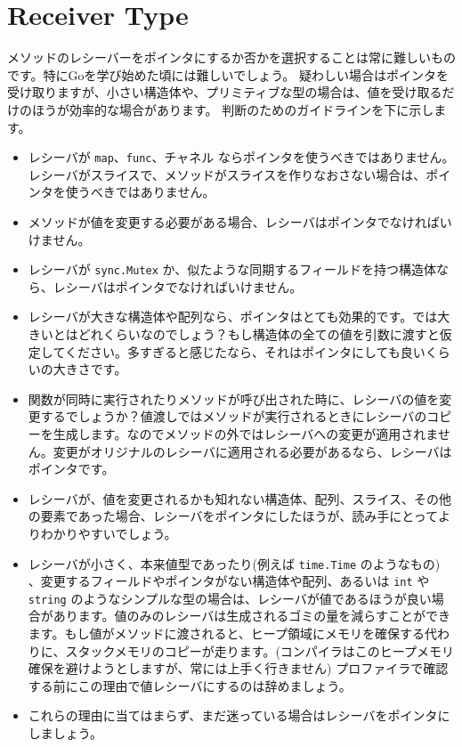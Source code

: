 \section{Receiver Type}

メソッドのレシーバーをポインタにするか否かを選択することは常に難しいものです。特にGoを学び始めた頃には難しいでしょう。 疑わしい場合はポインタを受け取りますが、小さい構造体や、プリミティブな型の場合は、値を受け取るだけのほうが効率的な場合があります。 判断のためのガイドラインを下に示します。

\begin{itemize}
  \item レシーバが \texttt{map}、\texttt{func}、チャネル ならポインタを使うべきではありません。レシーバがスライスで、メソッドがスライスを作りなおさない場合は、ポインタを使うべきではありません。
  \item メソッドが値を変更する必要がある場合、レシーバはポインタでなければいけません。
  \item レシーバが \texttt{sync.Mutex} か、似たような同期するフィールドを持つ構造体なら、レシーバはポインタでなければいけません。
  \item レシーバが大きな構造体や配列なら、ポインタはとても効果的です。では大きいとはどれくらいなのでしょう？もし構造体の全ての値を引数に渡すと仮定してください。多すぎると感じたなら、それはポインタにしても良いくらいの大きさです。
  \item 関数が同時に実行されたりメソッドが呼び出された時に、レシーバの値を変更するでしょうか？値渡しではメソッドが実行されるときにレシーバのコピーを生成します。なのでメソッドの外ではレシーバへの変更が適用されません。変更がオリジナルのレシーバに適用される必要があるなら、レシーバはポインタです。
  \item レシーバが、値を変更されるかも知れない構造体、配列、スライス、その他の要素であった場合、レシーバをポインタにしたほうが、読み手にとってよりわかりやすいでしょう。
  \item レシーバが小さく、本来値型であったり(例えば \texttt{time.Time} のようなもの) 、変更するフィールドやポインタがない構造体や配列、あるいは \texttt{int} や \texttt{string} のようなシンプルな型の場合は、レシーバが値であるほうが良い場合があります。値のみのレシーバは生成されるゴミの量を減らすことができます。もし値がメソッドに渡されると、ヒープ領域にメモリを確保する代わりに、スタックメモリのコピーが走ります。(コンパイラはこのヒープメモリ確保を避けようとしますが、常には上手く行きません) プロファイラで確認する前にこの理由で値レシーバにするのは辞めましょう。
  \item これらの理由に当てはまらず、まだ迷っている場合はレシーバをポインタにしましょう。
\end{itemize}
